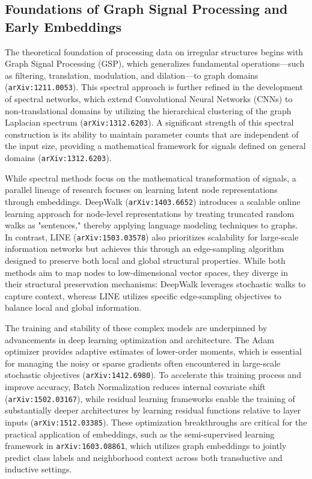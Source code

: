 \documentclass[11pt]{article}
\begin{document}
\subsection{Foundations of Graph Signal Processing and Early Embeddings}

The theoretical foundation of processing data on irregular structures begins with Graph Signal Processing (GSP), which generalizes fundamental operations—such as filtering, translation, modulation, and dilation—to graph domains (\texttt{arXiv:1211.0053}). This spectral approach is further refined in the development of spectral networks, which extend Convolutional Neural Networks (CNNs) to non-translational domains by utilizing the hierarchical clustering of the graph Laplacian spectrum (\texttt{arXiv:1312.6203}). A significant strength of this spectral construction is its ability to maintain parameter counts that are independent of the input size, providing a mathematical framework for signals defined on general domains (\texttt{arXiv:1312.6203}).

While spectral methods focus on the mathematical transformation of signals, a parallel lineage of research focuses on learning latent node representations through embeddings. DeepWalk (\texttt{arXiv:1403.6652}) introduces a scalable online learning approach for node-level representations by treating truncated random walks as "sentences," thereby applying language modeling techniques to graphs. In contrast, LINE (\texttt{arXiv:1503.03578}) also prioritizes scalability for large-scale information networks but achieves this through an edge-sampling algorithm designed to preserve both local and global structural properties. While both methods aim to map nodes to low-dimensional vector spaces, they diverge in their structural preservation mechanisms: DeepWalk leverages stochastic walks to capture context, whereas LINE utilizes specific edge-sampling objectives to balance local and global information.

The training and stability of these complex models are underpinned by advancements in deep learning optimization and architecture. The Adam optimizer provides adaptive estimates of lower-order moments, which is essential for managing the noisy or sparse gradients often encountered in large-scale stochastic objectives (\texttt{arXiv:1412.6980}). To accelerate this training process and improve accuracy, Batch Normalization reduces internal covariate shift (\texttt{arXiv:1502.03167}), while residual learning frameworks enable the training of substantially deeper architectures by learning residual functions relative to layer inputs (\texttt{arXiv:1512.03385}). These optimization breakthroughs are critical for the practical application of embeddings, such as the semi-supervised learning framework in \texttt{arXiv:1603.08861}, which utilizes graph embeddings to jointly predict class labels and neighborhood context across both transductive and inductive settings.
\end{document}
